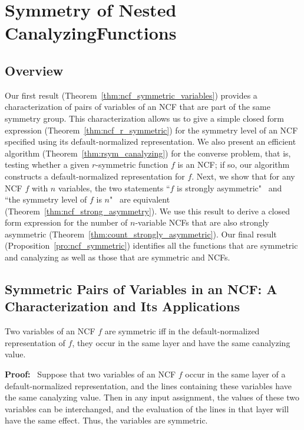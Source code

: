 \section{Symmetry of Nested Canalyzing\newline Functions}
\label{sec:ncf_and_symmetry}

\subsection{Overview}
\label{sse:res_overview}
Our first result (Theorem~\ref{thm:ncf_symmetric_variables})
provides a characterization of pairs of variables of an NCF
that are part of the same symmetry group. 
This characterization allows us to give a simple closed form
expression (Theorem~\ref{thm:ncf_r_symmetric}) 
for the symmetry level of an NCF specified using
its default-normalized representation.
We also present an efficient algorithm (Theorem~\ref{thm:rsym_canalyzing})
for the converse problem, that is,
testing whether a given $r$-symmetric function $f$ is an NCF;
if so, our algorithm constructs a default-normalized 
representation for $f$.
Next, we show that for any NCF $f$ with $n$ variables,
the two statements ``$f$ is strongly asymmetric" ~and~
``the symmetry level of $f$ is $n$"~ are equivalent 
(Theorem~\ref{thm:ncf_strong_asymmetry}).
We use this result to derive a closed form expression 
for the number of $n$-variable NCFs that are 
also strongly asymmetric (Theorem~\ref{thm:count_strongly_asymmetric}).
Our final result (Proposition~\ref{pro:ncf_symmetric})
identifies all the functions that are symmetric and
canalyzing as well as those that are symmetric and NCFs.

\subsection{Symmetric Pairs of Variables in an NCF: A Characterization
and Its Applications}
\label{sse:ncf_strong_sym}

\begin{theorem}\label{thm:ncf_symmetric_variables}
Two variables of an NCF $f$ are symmetric iff
in the default-normalized representation of $f$,
they occur in the same layer and have the same canalyzing value.
\end{theorem}
\noindent
\textbf{Proof:}~
Suppose that two variables of an NCF $f$ occur in the same layer of a
default-normalized representation, and the lines containing these variables
have the same canalyzing value.  Then in any input assignment, the
values of these two variables can be interchanged, and the evaluation
of the lines in that layer will have the same effect.  Thus, the
variables are symmetric.

